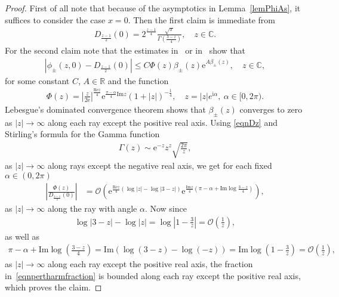 \documentclass{amsart}
\numberwithin{equation}{section}
\begin{document}
\begin{proof}
First of all note that because of the asymptotics in Lemma~\ref{lemPhiAs}, it suffices to consider the case $x=0$. Then the first claim is immediate
from
 \begin{align*}\tag{$*$}\label{eqnDz}
  D_{\frac{z-1}{2}}(0) = 2^{\frac{z-1}{4}} \frac{\sqrt{\pi}}{\Gamma\left(\frac{3-z}{4}\right)}, \quad z\in{{\mathbb C}}. 
 \end{align*}
For the second claim note that the estimates in~\cite[Lemma~3.2]{ckk} or in~\cite[Corollary~2.6]{chelkak} show that
  \begin{align*}
   \left| \phi_\pm(z,0) - D_{\frac{z-1}{2}}(0)\right| \leq C \Phi(z) \beta_\pm(z) {\mathrm{e}}^{A \beta_\pm(z)}, \quad z\in{{\mathbb C}},
  \end{align*}
 for some constant $C$, $A\in{{\mathbb R}}$ and the function
 \begin{align*}
  \Phi(z) = \left|\frac{z}{2{\mathrm{e}}}\right|^{\frac{{\mathrm{Re}} z}{4}} {\mathrm{e}}^{\frac{\pi-\alpha}{4}{\mathrm{Im}} z} (1+|z|)^{-\frac{1}{4}}, \quad z=|z|e^{{\mathrm{i}}\alpha},~\alpha\in[0,2\pi).
 \end{align*} 
 Lebesgue's dominated convergence theorem shows that $\beta_\pm(z)$ converges to zero as $|z|\rightarrow\infty$ along each ray except the positive real axis.
 Using \eqref{eqnDz} and Stirling's formula for the Gamma function
 \begin{align*}
  \Gamma(z) \sim {\mathrm{e}}^{-z} z^z \sqrt{\frac{2\pi}{z}},
 \end{align*}
 as $|z|\rightarrow\infty$ along rays except the negative real axis,
 we get for each fixed $\alpha\in(0,2\pi)$
 \begin{align}\label{eqnpertharmfraction}
  \left|\frac{\Phi(z)}{D_{\frac{z-1}{2}}(0)}\right| & = {\mathcal{O}}\left({\mathrm{e}}^{\frac{{\mathrm{Re}} z}{4}\left(\log|z|-\log|3-z|\right)} {\mathrm{e}}^{\frac{{\mathrm{Im}} z}{4}\left(\pi-\alpha + {\mathrm{Im}}\log\frac{3-z}{4}\right)} \right),
 \end{align}
  as $|z|\rightarrow\infty$ along the ray with angle $\alpha$.
  Now since
  \begin{align*}
   \log|3-z|-\log|z| =  \log\left| 1-\frac{3}{z}\right| = {\mathcal{O}}\left(\frac{1}{z}\right),  
  \end{align*}
  as well as
  \begin{align*}
   \pi-\alpha + {\mathrm{Im}}\log \left(\frac{3-z}{4}\right) = {\mathrm{Im}}\left( \log(3-z) - \log(-z)\right) = {\mathrm{Im}} \log\left( 1-\frac{3}{z}\right) = {\mathcal{O}}\left(\frac{1}{z}\right),
  \end{align*}
  as $|z|\rightarrow\infty$ along each ray except the positive real axis, the fraction in~\eqref{eqnpertharmfraction} is bounded along each ray except the positive real axis, which proves the claim.
\end{proof}
\end{document}
